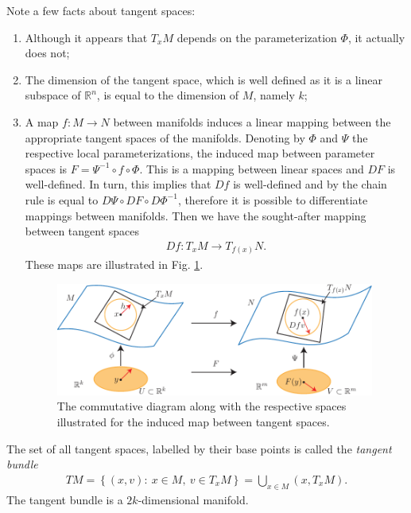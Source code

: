 \begin{remark}[]
	Note a few facts about tangent spaces:
	\begin{enumerate}
		\item Although it appears that $T_{x}M$ depends on the parameterization $\Phi$, it actually does not;
		\item The dimension of the tangent space, which is well defined as it is a linear subspace of $\mathbb{R}^{n}$, is equal to the dimension of $M$, namely $k$;
		\item A map $f:M\to N$ between manifolds induces a linear mapping between the appropriate tangent spaces of the manifolds. Denoting by $\Phi$ and $\Psi$ the respective local parameterizations, the induced map between parameter spaces is $F= \Psi^{-1} \circ f \circ \Phi$. This is a mapping between linear spaces and $DF$ is well-defined. In turn, this implies that $Df$ is well-defined and by the chain rule is equal to $D\Psi \circ DF \circ D\Phi^{-1}$, therefore it is possible to differentiate mappings between manifolds. Then we have the sought-after mapping between tangent spaces 
			\begin{align}
				Df: T_{x}M \to T_{f(x)}N.
			\end{align}
			These maps are illustrated in Fig. \ref{fig:induced_tangent_map}.
			\begin{figure}[h!]
				\centering
				\includegraphics[width=0.99\textwidth]{figures/ch9/7induced_tangent_map.pdf}
				\caption{The commutative diagram along with the respective spaces illustrated for the induced map between tangent spaces.}
				\label{fig:induced_tangent_map}
			\end{figure}
	\end{enumerate}
\end{remark}

\begin{definition}
	The set of all tangent spaces, labelled by their base points is called the \emph{tangent bundle}
	\begin{align}
		\boxed{
			TM = \left\{ (x,v):\ x\in M,\ v\in T_{x}M \right\} = \bigcup_{x\in M}(x, T_{x}M).
		}
	\end{align}
The tangent bundle is a $2k$-dimensional manifold.	
\end{definition}

